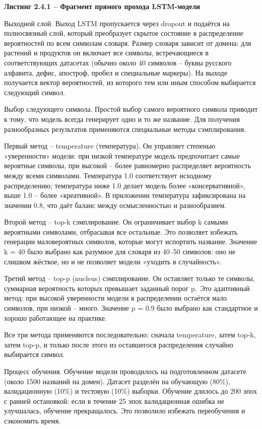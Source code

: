 \textbf{Листинг 2.4.1 -- Фрагмент прямого прохода LSTM-модели}



Выходной слой. Выход LSTM пропускается через dropout и подаётся на полносвязный слой, который преобразует скрытое состояние в распределение вероятностей по всем символам словаря. Размер словаря зависит от домена: для растений и продуктов он включает все символы, встречающиеся в соответствующих датасетах (обычно около 40 символов -- буквы русского алфавита, дефис, апостроф, пробел и специальные маркеры). На выходе получается вектор вероятностей, из которого тем или иным способом выбирается следующий символ.

Выбор следующего символа. Простой выбор самого вероятного символа приводит к тому, что модель всегда генерирует одно и то же название. Для получения разнообразных результатов применяются специальные методы сэмплирования.

Первый метод -- temperature (температура). Он управляет степенью «уверенности» модели: при низкой температуре модель предпочитает самые вероятные символы, при высокой -- более равномерно распределяет вероятность между всеми символами. Температура 1.0 соответствует исходному распределению; температура ниже 1.0 делает модель более «консервативной», выше 1.0 -- более «креативной». В приложении температура зафиксирована на значении 0.8, что даёт баланс между осмысленностью и разнообразием.

Второй метод -- top-k сэмплирование. Он ограничивает выбор k самыми вероятными символами, отбрасывая все остальные. Это позволяет избежать генерации маловероятных символов, которые могут испортить название. Значение k = 40 было выбрано как разумное для словаря из 40--50 символов: оно не слишком жёсткое, но и не позволяет модели «уходить в случайность».

Третий метод -- top-p (nucleus) сэмплирование. Он оставляет только те символы, суммарная вероятность которых превышает заданный порог p.~Это адаптивный метод: при высокой уверенности модели в распределении остаётся мало символов, при низкой -- много. Значение p = 0.9 было выбрано как стандартное и хорошо работающее на практике.

Все три метода применяются последовательно: сначала temperature, затем top-k, затем top-p, и только после этого из оставшегося распределения случайно выбирается символ.

Процесс обучения. Обучение модели проводилось на подготовленном датасете (около 1500 названий на домен). Датасет разделён на обучающую (80\%), валидационную (10\%) и тестовую (10\%) выборки. Обучение длилось до 200 эпох с ранней остановкой: если в течение 25 эпох валидационная ошибка не улучшалась, обучение прекращалось. Это позволило избежать переобучения и сэкономить время.

